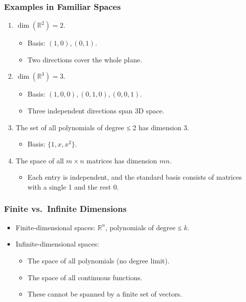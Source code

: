 \documentclass[
  letterpaper,
  DIV=11,
  numbers=noendperiod]{scrreprt}
\providecommand{\tightlist}{%
  \setlength{\itemsep}{0pt}\setlength{\parskip}{0pt}}
\begin{document}
\subsubsection{Examples in Familiar
Spaces}\label{examples-in-familiar-spaces}

\begin{enumerate}
\def\labelenumi{\arabic{enumi}.}
\item
  \(\dim(\mathbb{R}^2) = 2\).

  \begin{itemize}
  \tightlist
  \item
    Basis: \((1,0), (0,1)\).
  \item
    Two directions cover the whole plane.
  \end{itemize}
\item
  \(\dim(\mathbb{R}^3) = 3\).

  \begin{itemize}
  \tightlist
  \item
    Basis: \((1,0,0), (0,1,0), (0,0,1)\).
  \item
    Three independent directions span 3D space.
  \end{itemize}
\item
  The set of all polynomials of degree ≤ 2 has dimension 3.

  \begin{itemize}
  \tightlist
  \item
    Basis: \(\{1, x, x^2\}\).
  \end{itemize}
\item
  The space of all \(m \times n\) matrices has dimension \(mn\).

  \begin{itemize}
  \tightlist
  \item
    Each entry is independent, and the standard basis consists of
    matrices with a single 1 and the rest 0.
  \end{itemize}
\end{enumerate}

\subsubsection{Finite vs.~Infinite
Dimensions}\label{finite-vs.-infinite-dimensions}

\begin{itemize}
\item
  Finite-dimensional spaces: \(\mathbb{R}^n\), polynomials of degree ≤
  \(k\).
\item
  Infinite-dimensional spaces:

  \begin{itemize}
  \tightlist
  \item
    The space of all polynomials (no degree limit).
  \item
    The space of all continuous functions.
  \item
    These cannot be spanned by a finite set of vectors.
  \end{itemize}
\end{itemize}
\end{document}
